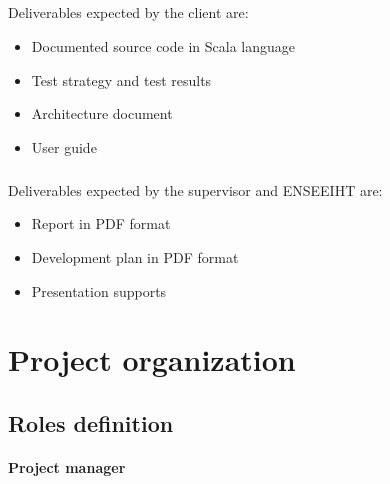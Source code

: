 \documentclass{report}
\begin{document}
\paragraph{}
\hspace{4mm}Deliverables expected by the client are:

\vspace{1.5mm}
\begin{itemize}
\item Documented source code in Scala language\vspace{1mm}
\item Test strategy and test results\vspace{1mm}
\item Architecture document\vspace{1mm}
\item User guide\vspace{1mm}
\end{itemize}

\paragraph{}
\hspace{4mm}Deliverables expected by the supervisor and ENSEEIHT are:

\vspace{1.5mm}
\begin{itemize}
\item Report in PDF format\vspace{1mm}
\item Development plan in PDF format\vspace{1mm}
\item Presentation supports\vspace{1mm}
\end{itemize}

\chapter{Project organization}

\section{Roles definition}

\subsubsection{Project manager}
\end{document}
